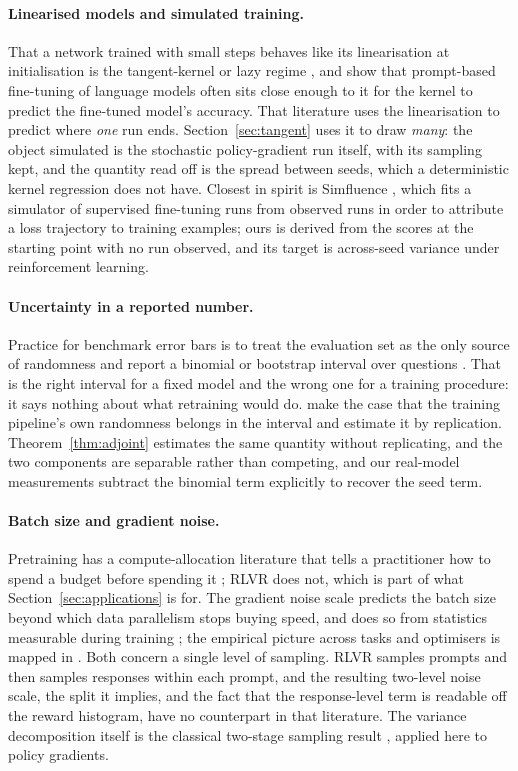 \paragraph{Linearised models and simulated training.} That a network trained with small steps
behaves like its linearisation at initialisation is the tangent-kernel or lazy regime
\citep{jacot2018ntk, lee2019wide, chizat2019lazy}, and \citet{malladi2023kernel} show that
prompt-based fine-tuning of language models often sits close enough to it for the kernel to
predict the fine-tuned model's accuracy. That literature uses the linearisation to predict where
\emph{one} run ends. Section~\ref{sec:tangent} uses it to draw \emph{many}: the object simulated is
the stochastic policy-gradient run itself, with its sampling kept, and the quantity read off is the
spread between seeds, which a deterministic kernel regression does not have. Closest in spirit is
Simfluence \citep{guu2023simfluence}, which fits a simulator of supervised fine-tuning runs from
observed runs in order to attribute a loss trajectory to training examples; ours is derived from
the scores at the starting point with no run observed, and its target is across-seed variance under
reinforcement learning.

\paragraph{Uncertainty in a reported number.} Practice for benchmark error bars is to treat the
evaluation set as the only source of randomness and report a binomial or bootstrap interval over
questions \citep{miller2024adding}. That is the right interval for a fixed model and the wrong one
for a training procedure: it says nothing about what retraining would do. \citet{bouthillier2021accounting}
make the case that the training pipeline's own randomness belongs in the interval and estimate it by
replication. Theorem~\ref{thm:adjoint} estimates the same quantity without replicating, and the two
components are separable rather than competing, and our real-model measurements subtract the binomial
term explicitly to recover the seed term.

\paragraph{Batch size and gradient noise.} Pretraining has a compute-allocation literature that
tells a practitioner how to spend a budget before spending it \citep{kaplan2020scaling}; RLVR does
not, which is part of what Section~\ref{sec:applications} is for. The gradient noise scale predicts
the batch size beyond
which data parallelism stops buying speed, and does so from statistics measurable during training
\citep{mccandlish2018empirical}; the empirical picture across tasks and optimisers is mapped in
\citet{shallue2019measuring}. Both concern a single level of sampling. RLVR samples prompts and then
samples responses within each prompt, and the resulting two-level noise scale, the split it implies,
and the fact that the response-level term is readable off the reward histogram, have no counterpart
in that literature. The variance decomposition itself is the classical two-stage sampling result
\citep{cochran1977sampling}, applied here to policy gradients.

